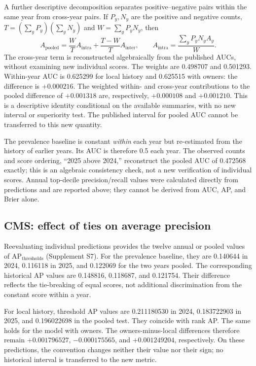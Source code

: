 A further descriptive decomposition separates positive--negative pairs within the same year from cross-year pairs. If $P_y,N_y$ are the positive and negative counts, $T=(\sum_yP_y)(\sum_yN_y)$ and $W=\sum_yP_yN_y$, then
\begin{equation}
 A_{\text{pooled}}=\frac{W}{T} A_{\mathrm{intra}}+
 \frac{T-W}{T} A_{\mathrm{inter}},\qquad
 A_{\mathrm{intra}}=\frac{\sum_y P_yN_y A_y}{W}.
\label{eq:decomp}
\end{equation}
The cross-year term is reconstructed algebraically from the published AUCs, without examining new individual scores. The weights are 0.498707 and 0.501293. Within-year AUC is 0.625299 for local history and 0.625515 with owners: the difference is $+0.000216$. The weighted within- and cross-year contributions to the pooled difference of $+0.001318$ are, respectively, $+0.000108$ and $+0.001210$. This is a descriptive identity conditional on the available summaries, with no new interval or superiority test. The published interval for pooled AUC cannot be transferred to this new quantity.

The prevalence baseline is constant \emph{within} each year but re-estimated from the history of earlier years\cite{hgbcode}. Its AUC is therefore 0.5 each year. The observed counts and score ordering, “2025 above 2024,” reconstruct the pooled AUC of 0.472568 exactly; this is an algebraic consistency check, not a new verification of individual scores. Annual top-decile precision/recall values were calculated directly from predictions and are reported above; they cannot be derived from AUC, AP, and Brier alone.

\subsection{CMS: effect of ties on average precision}
\label{sec:ties}
Reevaluating individual predictions provides the twelve annual or pooled values of $\mathrm{AP}_{\mathrm{thresholds}}$ (Supplement S7). For the prevalence baseline, they are 0.140644 in 2024, 0.116118 in 2025, and 0.122069 for the two years pooled. The corresponding historical AP values are 0.148816, 0.118687, and 0.121754. Their difference reflects the tie-breaking of equal scores, not additional discrimination from the constant score within a year.

For local history, threshold AP values are 0.211180530 in 2024, 0.183722903 in 2025, and 0.196022698 in the pooled test. They coincide with rank AP. The same holds for the model with owners. The owners-minus-local differences therefore remain $+0.001796527$, $-0.000175565$, and $+0.001249204$, respectively. On these predictions, the convention changes neither their value nor their sign; no historical interval is transferred to the new metric.

